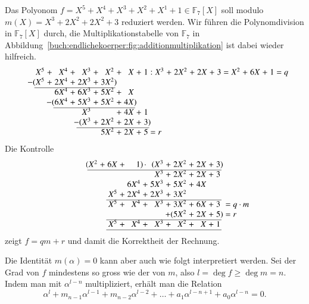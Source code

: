 \begin{beispiel}
Das Polyonom $f=X^5+X^4+X^3+X^2+X^1+1\in\mathbb{F}_7[X]$ soll modulo
$m(X)=X^3+2X^2+2X^2+3$ reduziert werden.
Wir führen die Polynomdivision in $\mathbb{F}_7[X]$ durch, die
Multiplikationstabelle von $\mathbb{F}_7$ in
Abbildung~\ref{buch:endlichekoerper:fig:additionmultiplikation}
ist dabei wieder hilfreich.
\[
\arraycolsep=1.4pt
\begin{array}{rcrcrcrcrcrcrcrcrcrcrcrcr}
X^5&+& X^4&+& X^3&+& X^2&+& X&+&1&:&X^3&+&2X^2&+&2X&+&3&=&X^2&+&6X&+&1\rlap{$\mathstrut=q$}\\
\llap{$-($}X^5&+&2X^4&+&2X^3&+&3X^2\rlap{$)$}& &  & & & &   & &    & &  & & & &   & &  & & \\
\cline{1-7}
   & &6X^4&+&6X^3&+&5X^2&+& X& & & &   & &    & &  & & & &   & &  & & \\
   & &\llap{$-($}6X^4&+&5X^3&+&5X^2&+&4X\rlap{$)$}& & & &   & &    & &  & & & &   & &  & & \\
\cline{3-9}
   & &    & & X^3& &    &+&4X&+&1& &   & &    & &  & & & &   & &  & & \\
   & &    & &\llap{$-($}X^3&+&2X^2&+&2X&+&3\rlap{$)$}& &   & &    & &  & & & &   & &  & & \\
\cline{5-11}
   & &    & &    & &5X^2&+&2X&+&5\rlap{$\mathstrut=r$}& &   & &    & &  & & & &   & &  & & \\
\end{array}
\]
Die Kontrolle
\[
\arraycolsep=1.4pt
\begin{array}{rcrcrcrcrcrcr}
\llap{$($}X^2&+&  6X&+&   1\rlap{$)$}&\cdot&\llap{$($} X^3&+&2X^2&+&2X&+&3\rlap{$)$}\\
\cline{1-13}
   & &    & &    &     & X^3&+&2X^2&+&2X&+&3\\
   & &    & &6X^4&  +  &5X^3&+&5X^2&+&4X& & \\
   & & X^5&+&2X^4&  +  &2X^3&+&3X^2& &  & & \\
\cline{3-13}
   & & X^5&+& X^4&  +  & X^3&+&3X^2&+&6X&+&3\rlap{$\phantom{)}=q\cdot m$}\\
   & &    & &    &     &    & &\llap{$+($}5X^2&+&2X&+&5\rlap{$)=r$}\\
\cline{3-13}
   & & X^5&+& X^4&  +  & X^3&+& X^2&+& X&+&1\\
\cline{3-13}
\end{array}
\]
zeigt $f=qm+r$ und damit die Korrektheit der Rechnung.
\end{beispiel}

Die Identität $m(\alpha)=0$ kann aber auch wie folgt interpretiert werden.
Sei der Grad von $f$ mindestens so gross wie der von $m$, also
$l=\deg f\ge \deg m=n$.
Indem man mit $\alpha^{l-n}$ multipliziert, erhält man die Relation
\[
\alpha^l + m_{n-1}\alpha^{l-1} + m_{n-2}\alpha^{l-2}+\dots +a_1\alpha^{l-n+1} + a_0\alpha^{l-n} = 0.
\]

